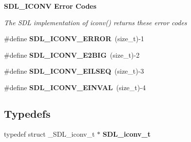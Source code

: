 \begin{Indent}{\bf S\+D\+L\+\_\+\+I\+C\+O\+N\+V Error Codes}\par
{\em The S\+D\+L implementation of iconv() returns these error codes }\begin{DoxyCompactItemize}
\item 
\#define {\bfseries S\+D\+L\+\_\+\+I\+C\+O\+N\+V\+\_\+\+E\+R\+R\+O\+R}~(size\+\_\+t)-\/1\label{_s_d_l__stdinc_8h_ada422bea61b05ed228c4f42e4aea2144}

\item 
\#define {\bfseries S\+D\+L\+\_\+\+I\+C\+O\+N\+V\+\_\+\+E2\+B\+I\+G}~(size\+\_\+t)-\/2\label{_s_d_l__stdinc_8h_a8147462b96bda427f0b41125e645b9ab}

\item 
\#define {\bfseries S\+D\+L\+\_\+\+I\+C\+O\+N\+V\+\_\+\+E\+I\+L\+S\+E\+Q}~(size\+\_\+t)-\/3\label{_s_d_l__stdinc_8h_adc8b6997623c449e7ed53a605faa9eb0}

\item 
\#define {\bfseries S\+D\+L\+\_\+\+I\+C\+O\+N\+V\+\_\+\+E\+I\+N\+V\+A\+L}~(size\+\_\+t)-\/4\label{_s_d_l__stdinc_8h_a03d30a2857731df69d31ffa802424a9e}

\end{DoxyCompactItemize}
\end{Indent}
\subsection*{Typedefs}
\begin{DoxyCompactItemize}
\item 
typedef struct \+\_\+\+S\+D\+L\+\_\+iconv\+\_\+t $\ast$ {\bfseries S\+D\+L\+\_\+iconv\+\_\+t}\label{_s_d_l__stdinc_8h_a37ee875bea397030104764a92857ae79}

\end{DoxyCompactItemize}
